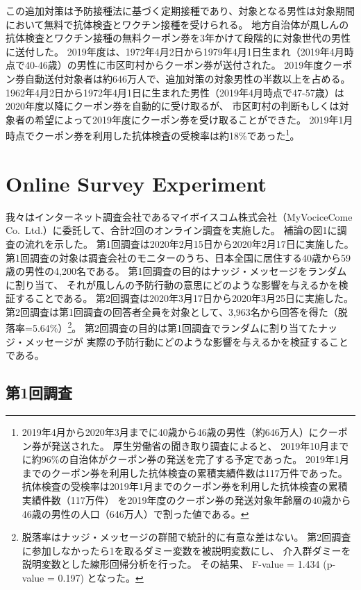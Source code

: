 \documentclass[
  11pt,
  a4paper,
]{article}
\begin{document}
この追加対策は予防接種法に基づく定期接種であり、対象となる男性は対象期間において無料で抗体検査とワクチン接種を受けられる。
地方自治体が風しんの抗体検査とワクチン接種の無料クーポン券を3年かけて段階的に対象世代の男性に送付した。
2019年度は、1972年4月2日から1979年4月1日生まれ（2019年4月時点で40-46歳）の男性に市区町村からクーポン券が送付された。
2019年度クーポン券自動送付対象者は約646万人で、追加対策の対象男性の半数以上を占める。
1962年4月2日から1972年4月1日に生まれた男性（2019年4月時点で47-57歳）は2020年度以降にクーポン券を自動的に受け取るが、
市区町村の判断もしくは対象者の希望によって2019年度にクーポン券を受け取ることができた。
2019年1月時点でクーポン券を利用した抗体検査の受検率は約18\%であった\footnote{2019年4月から2020年3月までに40歳から46歳の男性（約646万人）にクーポン券が発送された。
  厚生労働省の聞き取り調査によると、
  2019年10月までに約96\%の自治体がクーポン券の発送を完了する予定であった。
  2019年1月までのクーポン券を利用した抗体検査の累積実績件数は117万件であった。
  抗体検査の受検率は2019年1月までのクーポン券を利用した抗体検査の累積実績件数（117万件）
  を2019年度のクーポン券の発送対象年齢層の40歳から46歳の男性の人口（646万人）で割った値である。
}。

\hypertarget{experiment}{%
\section{Online Survey Experiment}\label{experiment}}

我々はインターネット調査会社であるマイボイスコム株式会社（MyVociceCome Co.~Ltd.）に委託して、合計2回のオンライン調査を実施した。
補論の図1に調査の流れを示した。
第1回調査は2020年2月15日から2020年2月17日に実施した。
第1回調査の対象は調査会社のモニターのうち、日本全国に居住する40歳から59歳の男性の4,200名である。
第1回調査の目的はナッジ・メッセージをランダムに割り当て、
それが風しんの予防行動の意思にどのような影響を与えるかを検証することである。
第2回調査は2020年3月17日から2020年3月25日に実施した。
第2回調査は第1回調査の回答者全員を対象として、3,963名から回答を得た（脱落率=5.64\%）\footnote{脱落率はナッジ・メッセージの群間で統計的に有意な差はない。
  第2回調査に参加しなかったら1を取るダミー変数を被説明変数にし、
  介入群ダミーを説明変数とした線形回帰分析を行った。
  その結果、
  F-value = 1.434 (p-value = 0.197)
  となった。}。
第2回調査の目的は第1回調査でランダムに割り当てたナッジ・メッセージが
実際の予防行動にどのような影響を与えるかを検証することである。

\hypertarget{wave1}{%
\subsection{第1回調査}\label{wave1}}
\end{document}
